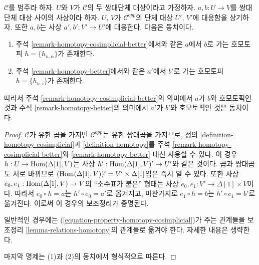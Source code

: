 \begin{lemma}
\label{lemma-compare-homotopies}
$\mathcal{C}$를 범주라 하자. $U$와 $V$가 $\mathcal{C}$의 두 쌍대단체
대상이라고 가정하자. $a, b : U \to V$를 쌍대단체 대상 사이의
사상이라 하자. $U$, $V$가 $\mathcal{C}^{opp}$의 단체 대상
$U'$, $V'$에 대응함을 상기하자. 또한 $a, b$는 사상
$a', b' : V' \to U'$에 대응한다. 다음은 동치이다.
\begin{enumerate}
\item 주석 \ref{remark-homotopy-cosimplicial-better}에서와 같은
$a$에서 $b$로 가는 호모토피 $h = \{h_{n, \alpha}\}$가 존재한다.
\item 주석 \ref{remark-homotopy-better}에서와 같은 $a'$에서 $b'$로
가는 호모토피 $h = \{h_{n, i}\}$가 존재한다.
\end{enumerate}
따라서 주석 \ref{remark-homotopy-cosimplicial-better}의 의미에서
$a$가 $b$와 호모토픽인 것과 주석 \ref{remark-homotopy-better}의
의미에서 $a'$가 $b'$와 호모토픽인 것은 동치이다.
\end{lemma}

\begin{proof}
$\mathcal{C}$가 유한 곱을 가지면 $\mathcal{C}^{opp}$는 유한 쌍대곱을
가지므로, 정의 \ref{definition-homotopy-cosimplicial}과
\ref{definition-homotopy}를 주석
\ref{remark-homotopy-cosimplicial-better}와
\ref{remark-homotopy-better} 대신 사용할 수 있다. 이 경우
$h : U \to \mathop{\mathrm{Hom}}\nolimits(\Delta[1], V)$는 사상
$h' : \mathop{\mathrm{Hom}}\nolimits(\Delta[1], V)' \to U'$와 같은 것이다. 곱과 쌍대곱도
서로 바뀌므로 $(\mathop{\mathrm{Hom}}\nolimits(\Delta[1], V))' = V' \times \Delta[1]$임은
즉시 알 수 있다. 또한 사상
$e_0, e_1 : \mathop{\mathrm{Hom}}\nolimits(\Delta[1], V) \to V$의 ``소수표가 붙은'' 형태는 사상
$e_0, e_1 : V' \to \Delta[1] \times V$이다. 따라서
$e_0 \circ h = a$는 $h' \circ e_0 = a'$로 옮겨지고, 마찬가지로
$e_1 \circ h = b$는 $h' \circ e_1 = b'$로 옮겨진다.
이로써 이 경우의 보조정리가 증명된다.

\medskip\noindent
일반적인 경우에는 (\ref{equation-property-homotopy-cosimplicial})가
주는 관계들을 보조정리 \ref{lemma-relations-homotopy}의 관계들로
옮겨야 한다. 자세한 내용은 생략한다.

\medskip\noindent
마지막 명제는 (1)과 (2)의 동치에서 형식적으로 따른다.
\end{proof}

